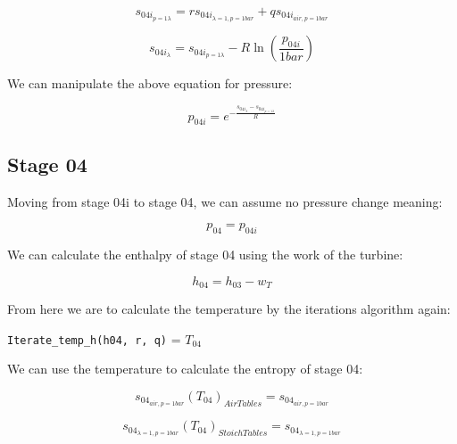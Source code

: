 \documentclass[titlepage]{article}
\begin{document}
    \begin{equation}
        s_{04i_{p=1 \lambda}} = r s_{04i_{\lambda=1, p=1 bar}} + q s_{04i_{air, p=1 bar}}
    \end{equation}

    \begin{equation}
        s_{04i_{\lambda}} = s_{04i_{p=1 \lambda}} - R \ln \left( \frac{p_{04i}}{1 bar} \right)
    \end{equation}

    We can manipulate the above equation for pressure:

    \begin{equation}
        p_{04i} = e^{- \frac{s_{04i_{\lambda}} - s_{04i_{p=1 \lambda}}}{R}}
    \end{equation}

    \subsection{Stage 04}

    Moving from stage 04i to stage 04, we can assume no pressure change meaning:

    \begin{equation}
        p_{04} = p_{04i}
    \end{equation}

    We can calculate the enthalpy of stage 04 using the work of the turbine:

    \begin{equation}
        h_{04} = h_{03} - w_{T}
    \end{equation}

    From here we are to calculate the temperature by the iterations algorithm again:

    \begin{center}
        \verb|Iterate_temp_h(h04, r, q)| = $T_{04}$
    \end{center}

    We can use the temperature to calculate the entropy of stage 04:

    \begin{equation}
        s_{04_{air, p= 1 bar}}(T_{04})_{Air Tables} = s_{04_{air, p=1 bar}}
    \end{equation}

    \begin{equation}
        s_{04_{\lambda=1, p= 1 bar}}(T_{04})_{Stoich  Tables} = s_{04_{\lambda=1, p = 1 bar}}
    \end{equation}
\end{document}
